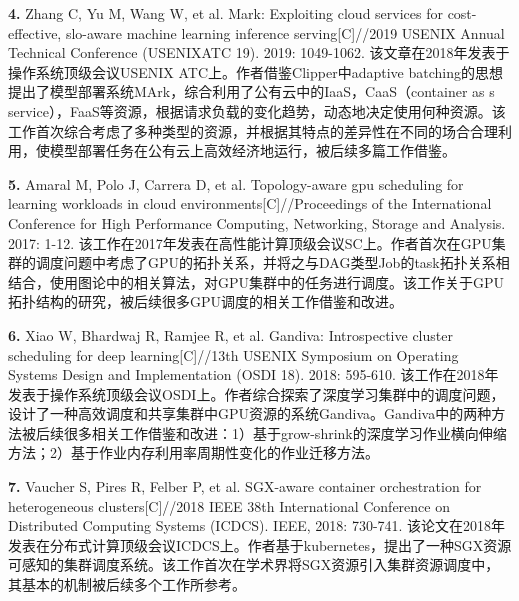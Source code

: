\textbf{4. }Zhang C, Yu M, Wang W, et al. Mark: Exploiting cloud services for cost-effective, slo-aware machine learning inference serving[C]//2019 {USENIX} Annual Technical Conference ({USENIX}{ATC} 19). 2019: 1049-1062. 该文章在2018年发表于操作系统顶级会议USENIX ATC上。作者借鉴Clipper中adaptive batching的思想提出了模型部署系统MArk，综合利用了公有云中的IaaS，CaaS（container as s service），FaaS等资源，根据请求负载的变化趋势，动态地决定使用何种资源。该工作首次综合考虑了多种类型的资源，并根据其特点的差异性在不同的场合合理利用，使模型部署任务在公有云上高效经济地运行，被后续多篇工作\parencite{gunasekaran2020characterizing,shirkoohi2020real,qin2020nuka,zhang2020qos,gunasekaran2020fifer,zhang2020hysia}借鉴。

\textbf{5. }Amaral M, Polo J, Carrera D, et al. Topology-aware gpu scheduling for learning workloads in cloud environments[C]//Proceedings of the International Conference for High Performance Computing, Networking, Storage and Analysis. 2017: 1-12. 该工作在2017年发表在高性能计算顶级会议SC上。作者首次在GPU集群的调度问题中考虑了GPU的拓扑关系，并将之与DAG类型Job的task拓扑关系相结合，使用图论中的相关算法，对GPU集群中的任务进行调度。该工作关于GPU拓扑结构的研究，被后续很多GPU调度的相关工作\parencite{zhao2020hived,jahani2019optimizing,han2019a,zhang2019a,hui2018device,chen2020deep,filippini2020hierarchical,geng2020interference,yeung2020horus}借鉴和改进。

\textbf{6. }Xiao W, Bhardwaj R, Ramjee R, et al. Gandiva: Introspective cluster scheduling for deep learning[C]//13th {USENIX} Symposium on Operating Systems Design and Implementation ({OSDI} 18). 2018: 595-610. 该工作在2018年发表于操作系统顶级会议OSDI上。作者综合探索了深度学习集群中的调度问题，设计了一种高效调度和共享集群中GPU资源的系统Gandiva。Gandiva中的两种方法被后续很多相关工作\parencite{yu2020salus,10.1145/3437984.3458837,liaw2019hypersched,narayanan2020heterogeneity,wang2020blink,jeon2019analysis,shen2019nexus,han2021tailored,li2018massively,mahajan2020themis,jayaram2019ffdl}借鉴和改进：1）基于grow-shrink的深度学习作业横向伸缩方法；2）基于作业内存利用率周期性变化的作业迁移方法。

\textbf{7. }Vaucher S, Pires R, Felber P, et al. SGX-aware container orchestration for heterogeneous clusters[C]//2018 IEEE 38th International Conference on Distributed Computing Systems (ICDCS). IEEE, 2018: 730-741. 该论文在2018年发表在分布式计算顶级会议ICDCS上。作者基于kubernetes，提出了一种SGX资源可感知的集群调度系统。该工作首次在学术界将SGX资源引入集群资源调度中，其基本的机制被后续多个工作\parencite{ma2020s3ml,alder2019s,gu2018gaiagpu,brito2019secure,krahn2020teemon,contiu2019anonymous}所参考。

